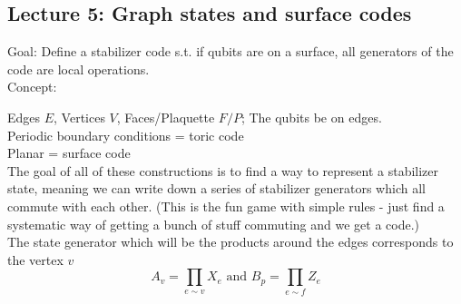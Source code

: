\subsection{Lecture 5: Graph states and surface codes}
Goal: Define a stabilizer code s.t. if qubits are on a surface, all generators of the code are local operations. \\
Concept: \\
\begin{center}
\end{center}

Edges $E$, Vertices $V$, Faces/Plaquette $F/P$;
The qubits be on edges. \\
Periodic boundary conditions = toric code \\
Planar = surface code \\
The goal of all of these constructions is to find a way to represent a stabilizer state, meaning we can write down a series of stabilizer generators which all commute with each other. (This is the fun game with simple rules - just find a systematic way of getting a bunch of stuff commuting and we get a code.) \\

The state generator which will be the products around the edges corresponds to the vertex $v$
\begin{equation}
    A_v = \prod_{e \sim v} X_e \text{ and } B_p =  \prod_{e \sim f} Z_e
\end{equation}

